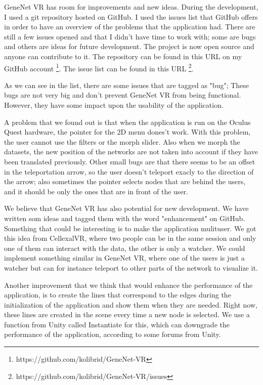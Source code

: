 GeneNet VR has room for improvements and new ideas. During the development, I used a git repository hosted on GitHub. I used the issues list that GitHub offers in order to have an overview of the problems that the application had. There are still a few issues opened and that I didn't have time to work with; some are bugs and others are ideas for future development. The project is now open source and anyone can contribute to it. The repository can be found in this URL on my GitHub account \footnote{https://github.com/kolibrid/GeneNet-VR}. The issue list can be found in this URL  \footnote{https://github.com/kolibrid/GeneNet-VR/issues}.

As we can see in the list, there are some issues that are tagged as "bug"; These bugs are not very big and don't prevent GeneNet VR from being functional. However, they have some impact upon the usability of the application.

A problem that we found out is that when the application is run on the Oculus Quest hardware, the pointer for the 2D menu dones't work. With this problem, the user cannot use the filters or the morph slider. Also when we morph the datasets, the new position of the networks are not taken into account if they have been translated previously. Other small bugs are that there seems to be an offset in the teleportation arrow, so the user doesn't teleport exacly to the direction of the arrow; also sometimes the pointer selects nodes that are behind the users, and it should be only the ones that are in front of the user.

We believe that GeneNet VR has also potential for new development. We have written som ideas and tagged them with the word "enhancement" on GitHub. Something that could be interesting is to make the application mulituser. We got this idea from CellexalVR\cite{cellexalvr}, where two people can be in the same session and only one of them can interact with the data, the other is only a watcher. We could implement something similar in GeneNet VR, where one of the users is just a watcher but can for instance teleport to other parts of the network to visualize it.

Another improvement that we think that would enhance the performance of the application, is to create the lines that correspond to the edges during the initialization of the application and show them when they are needed. Right now, these lines are created in the scene every time a new node is selected. We use a function from Unity called Instantiate for this, which can downgrade the performance of the application, according to some forums from Unity.

